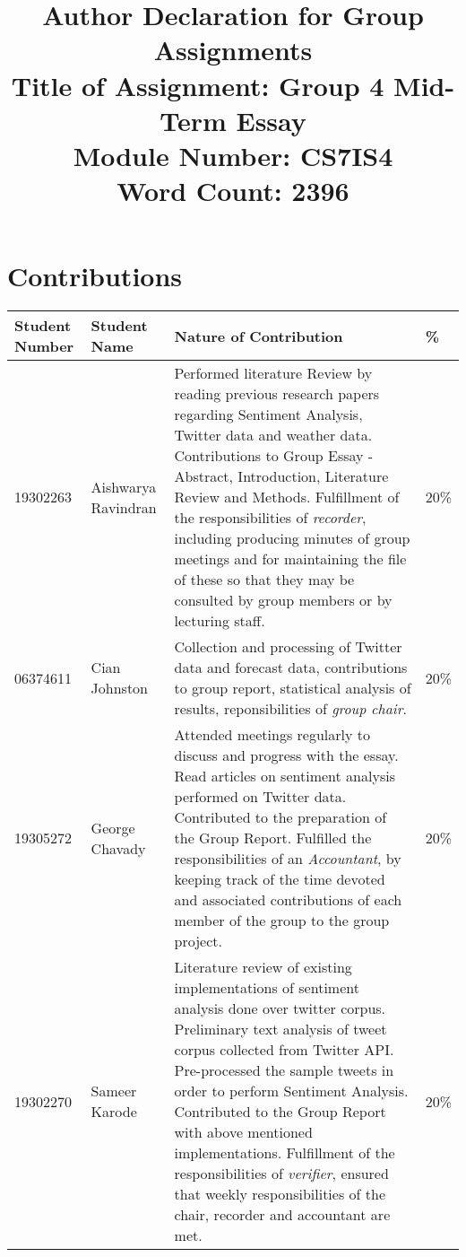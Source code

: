 \documentclass[a4paper,10pt]{article}
\begin{document}
\title{
    Author Declaration for Group Assignments \\
    \small Title of Assignment: Group 4 Mid-Term Essay \\
    \small Module Number: CS7IS4 \\
    \small Word Count: 2396
}
\author{}

\maketitle
\section{Contributions}
\begin{tabular}{ | p{2cm} | p{2cm} | p{10cm} | l | }
\hline
Student Number & Student Name & Nature of Contribution & \% \\ \hline
19302263 & Aishwarya Ravindran & Performed literature Review by reading previous research papers regarding Sentiment Analysis, Twitter data and weather data. Contributions to Group Essay - Abstract, Introduction, Literature Review and Methods. Fulfillment of the responsibilities of \textit{recorder}, including producing minutes of group meetings and for maintaining the file of these so that they may be consulted by group members or by lecturing staff. & 20\% \\ \hline
06374611 & Cian Johnston & Collection and processing of Twitter data and forecast data, contributions to group report, statistical analysis of results, reponsibilities of \textit{group chair}. & 20\% \\ \hline
19305272 & George Chavady & Attended meetings regularly to discuss and progress with the essay. Read articles on sentiment analysis performed on Twitter data. Contributed to the preparation of the Group Report. Fulfilled the responsibilities of an \textit{Accountant}, by keeping track of the time devoted and associated contributions of each member of the group to the group project. & 20\% \\ \hline
19302270 & Sameer Karode & Literature review of existing implementations of sentiment analysis done over twitter corpus. Preliminary text analysis of tweet corpus collected from Twitter API. Pre-processed the sample tweets in order to perform Sentiment Analysis. Contributed to the Group Report with above mentioned implementations. Fulfillment of the responsibilities of \textit{verifier}, ensured that weekly responsibilities of the chair, recorder and accountant are met. & 20\% \\ \hline

\end{tabular}
\end{document}
